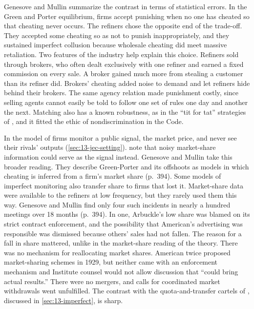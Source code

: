 Genesove and Mullin summarize the contrast in terms of statistical errors. In the Green and Porter equilibrium,
firms accept punishing when no one has cheated so that cheating never occurs. The refiners chose the opposite end
of the trade-off. They accepted some cheating so as not to punish inappropriately, and they sustained imperfect
collusion because wholesale cheating did meet massive retaliation. Two features of the industry help explain this
choice. Refiners sold through brokers, who often dealt exclusively with one refiner and earned a fixed commission
on every sale. A broker gained much more from stealing a customer than its refiner did. Brokers' cheating added
noise to demand and let refiners hide behind their brokers. The same agency relation made punishment costly,
since selling agents cannot easily be told to follow one set of rules one day and another the next. Matching also
has a known robustness, as in the ``tit for tat'' strategies of \citet{Axelrod1984}, and it fitted the ethic of
nondiscrimination in the Code.

In the model of \citet{GreenPorter1984} firms monitor a public signal, the market price, and never see their
rivals' outputs (\cref{sec:13-jec-setting}). \citet[p.~90]{GreenPorter1984} note that noisy market-share
information could serve as the signal instead. Genesove and Mullin take this broader reading. They describe
Green-Porter and its offshoots as models in which cheating is inferred from a firm's market share (p.~394). Some
models of imperfect monitoring also transfer share to firms that lost it. Market-share data were available to the
refiners at low frequency, but they rarely used them this way. Genesove and Mullin find only four such incidents in nearly a hundred meetings
over 18 months (p.~394). In one, Arbuckle's low share was blamed on its strict contract enforcement, and the
possibility that American's advertising was responsible was dismissed because others' sales had not fallen. The
reason for a fall in share mattered, unlike in the market-share reading of the theory. There was no mechanism for reallocating market shares.
American twice proposed market-sharing schemes in 1929, but neither came with an enforcement mechanism and
Institute counsel would not allow discussion that ``could bring actual results.'' There were no mergers, and
calls for coordinated market withdrawals went unfulfilled. The contrast with the quota-and-transfer cartels of
\citet{HarringtonSkrzypacz2011}, discussed in \cref{sec:13-imperfect}, is sharp.

